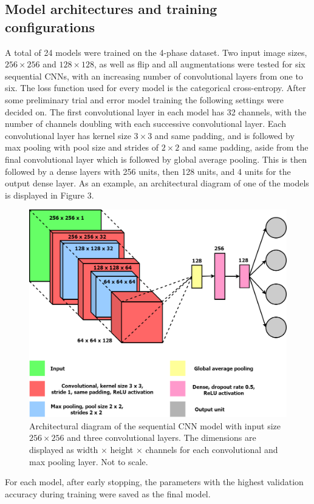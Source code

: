 \documentclass[12pt]{article}
\begin{document}
\subsection{Model architectures and training configurations}
A total of 24 models were trained on the 4-phase dataset. Two input image sizes, $256 \times 256$ and $128 \times 128$, as well as flip and all augmentations were tested for six sequential CNNs, with an increasing number of convolutional layers from one to six.  The loss function used for every model is the categorical cross-entropy. After some preliminary trial and error model training the following settings were decided on. The first convolutional layer in each model has 32 channels, with the number of channels doubling with each successive convolutional layer. Each convolutional layer has kernel size $3 \times 3$ and same padding, and is followed by max pooling with pool size and strides of $2 \times 2$ and same padding, aside from the final convolutional layer which is followed by global average pooling. This is then followed by a dense layers with 256 units, then 128 units, and 4 units for the output dense layer. As an example, an architectural diagram of one of the models is displayed in Figure 3.
\begin{figure}[h]
\centering
\includegraphics[width=6.6in]{images/v3_conv_3_diagram.png}
\caption{Architectural diagram of the sequential CNN model with input size $256 \times 256$ and three convolutional layers. The dimensions are displayed as width $\times$ height $\times$ channels for each convolutional and max pooling layer. Not to scale.}
\end{figure}
For each model, after early stopping, the parameters with the highest validation accuracy during training were saved as the final model.
\end{document}
